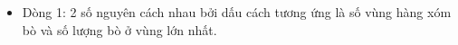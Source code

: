 \begin{itemize}
	\item     Dòng 1: 2 số nguyên cách nhau bởi dấu cách tương ứng là số   vùng hàng xóm bò và số lượng bò ở vùng lớn nhất.   
\end{itemize}